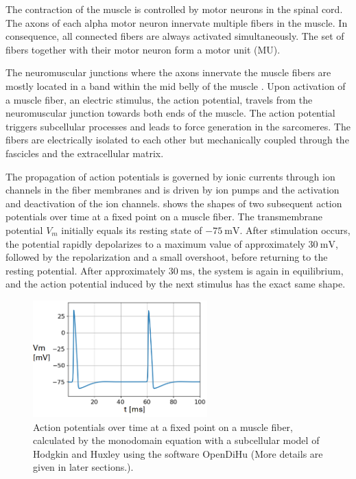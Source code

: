 The contraction of the muscle is controlled by motor neurons in the spinal cord. The axons of each alpha motor neuron innervate multiple fibers in the muscle. In consequence, all connected fibers are always activated simultaneously. The set of fibers together with their motor neuron form a motor unit (MU).

The neuromuscular junctions where the axons innervate the muscle fibers are mostly located in a band within the mid belly of the muscle \cite{Childers2004}. Upon activation of a muscle fiber, an electric stimulus, the action potential, travels from the neuromuscular junction towards both ends of the muscle. The action potential triggers subcellular processes and leads to force generation in the sarcomeres. The fibers are electrically isolated to each other but mechanically coupled through the fascicles and the extracellular matrix.

The propagation of action potentials is governed by ionic currents through ion channels in the fiber membranes and is driven by ion pumps and the activation and deactivation of the ion channels.  shows the shapes of two subsequent action potentials over time at a fixed point on a muscle fiber. The transmembrane potential $V_m$ initially equals its resting state of $\SI{-75}{\milli\volt}$. After stimulation occurs, the potential rapidly depolarizes to a maximum value of approximately $\SI{30}{\milli\volt}$, followed by the repolarization and a small overshoot, before returning to the resting potential. After approximately $\SI{30}{\milli\second}$, the system is again in equilibrium, and the action potential induced by the next stimulus has the exact same shape.
 
\begin{figure}
  \centering%
  \includegraphics[width=0.6\textwidth]{images/introduction/action_potentials.png}%
  \caption{Action potentials over time at a fixed point on a muscle fiber, calculated by the monodomain equation with a subcellular model of Hodgkin and Huxley using the software OpenDiHu (More details are given in later sections.).}%
  \label{fig:action_potentials}%
\end{figure}%


